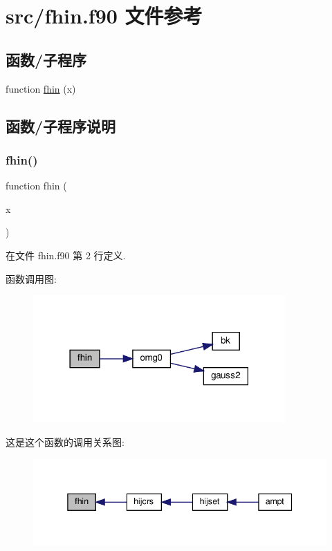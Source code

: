\hypertarget{fhin_8f90}{}\section{src/fhin.f90 文件参考}
\label{fhin_8f90}
\subsection*{函数/子程序}
\begin{DoxyCompactItemize}
\item 
function \mbox{\hyperlink{fhin_8f90_a70f77fd8a6832dd62b9dc5b9dff4aaa9}{fhin}} (x)
\end{DoxyCompactItemize}


\subsection{函数/子程序说明}
\mbox{\label{fhin_8f90_a70f77fd8a6832dd62b9dc5b9dff4aaa9}} 
\subsubsection{\texorpdfstring{fhin()}{fhin()}}
{\footnotesize\ttfamily function fhin (\begin{DoxyParamCaption}\item[{}]{x }\end{DoxyParamCaption})}



在文件 fhin.\+f90 第 2 行定义.

函数调用图\+:
\nopagebreak
\begin{figure}[H]
\begin{center}
\leavevmode
\includegraphics[width=273pt]{fhin_8f90_a70f77fd8a6832dd62b9dc5b9dff4aaa9_cgraph}
\end{center}
\end{figure}
这是这个函数的调用关系图\+:
\nopagebreak
\begin{figure}[H]
\begin{center}
\leavevmode
\includegraphics[width=338pt]{fhin_8f90_a70f77fd8a6832dd62b9dc5b9dff4aaa9_icgraph}
\end{center}
\end{figure}
